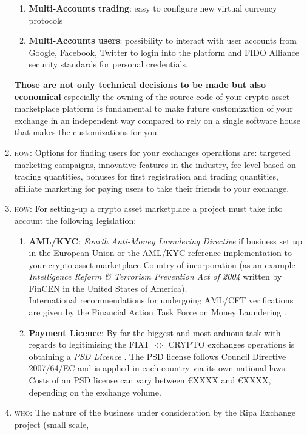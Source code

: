 \documentclass[11pt,fleqn,oneside]{book} %
\begin{document}
\begin{enumerate}
\begin{enumerate}[label*=\arabic*.]
			\item \textbf{Multi-Accounts trading}: easy to configure new virtual currency protocols
			\item \textbf{Multi-Accounts users}: possibility to interact with user accounts from Google, Facebook, Twitter 
			to login into the platform and FIDO Alliance security standards for personal credentials.
		\end{enumerate}	
	\textbf{Those are not only technical decisions to be made but also economical} especially the owning of the source code of your crypto asset
	marketplace platform is fundamental to make future customization of your exchange in an independent way compared to rely on a single
	software house that makes the customizations for you.
	\item \textsc{how}: Options for finding users for your exchanges operations are: targeted marketing campaigns, innovative features in the industry,
	fee level based on trading quantities, bonuses for first registration and trading quantities, affiliate marketing for paying users to take their friends
	to your exchange.
	\item \textsc{how}: For setting-up a crypto asset marketplace a project must take into account the following legislation:
		\begin{enumerate}[label*=\arabic*.]
			\item \textbf{AML/KYC}: \textit{Fourth Anti-Money Laundering Directive} if business set up in the European Union \cite{4AMLD} or the AML/KYC reference implementation
			to your crypto asset marketplace Country of incorporation (as an example \textit{Intelligence Reform \& Terrorism Prevention Act of 2004}
			written by FinCEN in the United States of America).\\
			International recommendations for undergoing AML/CFT verifications are given by the Financial Action Task Force on Money Laundering \cite{FATF}.
			\item \textbf{Payment Licence}: By far the biggest and most arduous task with regards to legitimising the 
			FIAT $\Leftrightarrow$ CRYPTO exchanges operations is obtaining a \textit{PSD Licence} \cite{PSD}. 
			The PSD license follows Council Directive 2007/64/EC and is applied in each country via its own national laws. 
			Costs of an PSD license can vary between \euro XXXX and \euro XXXX, depending on the exchange volume.
		\end{enumerate}
	\item \textsc{who}: The nature of the business under consideration by the Ripa Exchange project (small scale,

\end{enumerate}
\end{document}
